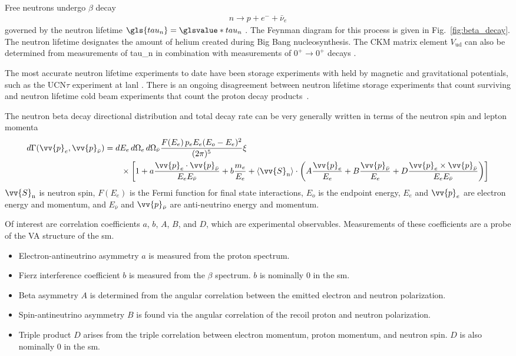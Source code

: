 Free neutrons undergo $\beta$ decay
%
\begin{gather}
    n\rightarrow p+ e^-+\bar{\nu}_e
\end{gather}
%
governed by the neutron lifetime $\gls{tau_n}=\glsvalue*{tau_n}$ \cite{pdg2022}. The Feynman diagram for this process is given in Fig.~\ref{fig:beta_decay}. The neutron lifetime designates the amount of helium created during Big Bang nucleosynthesis. The CKM matrix element $V_\text{ud}$ can also be determined from measurements of \gls{tau_n} in combination with measurements of $0^+\rightarrow0^+$ decays \cite{Young2014}.

The most accurate neutron lifetime experiments to date have been storage experiments with \ucn held by magnetic and gravitational potentials, such as the UCN$\tau$ experiment at \acrshort{lanl} \cite{gonzalez_ucn_tau}. There is an ongoing disagreement between neutron lifetime storage experiments that count surviving \ucn and neutron lifetime cold beam experiments that count the proton decay products~\cite{czarnecki2018}.

The neutron beta decay directional distribution and total decay rate can be very generally written in terms of the neutron spin and lepton momenta \cite{Young2014}
%
\begin{align}
    d\Gamma(\vv{p}_e, \vv{p}_{\bar{\nu}}) &= dE_e\,d\Omega_e \,d\Omega_{\bar{\nu}} \frac{F(E_e)\,p_e E_e (E_o-E_e)^2}{(2\pi)^5} \xi \nonumber \\
    &\quad\quad \times \left[1 + a\frac{\vv{p}_e \cdot \vv{p}_{\bar{\nu}}}{E_e E_{\bar{\nu}}}
    +b\frac{m_e}{E_e} + \langle \vv{S}_\text{n} \rangle \cdot
    \left( A\frac{\vv{p}_e}{E_e} + B \frac{\vv{p}_{\bar{\nu}}}{E_e} + D\frac{\vv{p}_e\times \vv{p}_{\bar{\nu}}}{E_e E_{\bar{\nu}}}
    \right) \right]
\end{align}
%
$\vv{S}_\text{n}$ is neutron spin, $F(E_e)$ is the Fermi function for final state interactions, $E_o$ is the endpoint energy, $E_e$ and $\vv{p}_e$ are electron energy and momentum, and $E_{\bar{\nu}}$ and $\vv{p}_{\bar{\nu}}$ are anti-neutrino energy and momentum.

Of interest are correlation coefficients $a$, $b$, $A$, $B$, and $D$, which are experimental observables. Measurements of these coefficients are a probe of the V\textendash A structure of the \acrshort*{sm}. 
%
\begin{itemize}
    \item Electron-antineutrino asymmetry $a$ is measured from the proton spectrum.
    \item Fierz interference coefficient $b$ is measured from the $\beta$ spectrum. $b$ is nominally $0$ in the \acrshort*{sm}.
    \item Beta asymmetry $A$ is determined from the angular correlation between the emitted electron and neutron polarization.
    \item Spin-antineutrino asymmetry $B$ is found via the angular correlation of the recoil proton and neutron polarization.
    \item Triple product $D$ arises from the triple correlation between electron momentum, proton momentum, and neutron spin. $D$ is also nominally $0$ in the \acrshort*{sm}.
\end{itemize}

